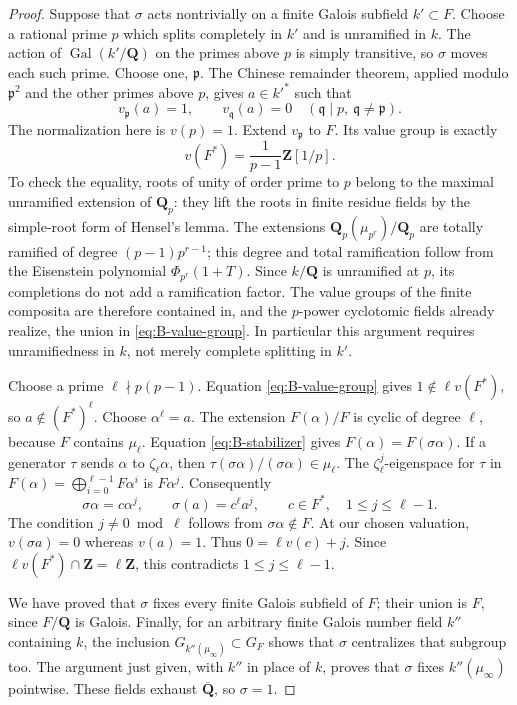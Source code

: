 \documentclass[11pt,a4paper]{article}
\begin{document}
\begin{proof}
Suppose that $\sigma$ acts nontrivially on a finite Galois subfield
$k'\subset F$. Choose a rational prime $p$ which splits completely in $k'$
and is unramified in $k$. The action of
$\operatorname{Gal}(k'/\mathbf Q)$ on the primes above $p$ is simply
transitive, so $\sigma$ moves each such prime. Choose one, $\mathfrak p$.
The Chinese remainder theorem, applied modulo $\mathfrak p^2$ and the
other primes above $p$, gives $a\in k'^*$ such that
\[
 v_{\mathfrak p}(a)=1,\qquad
 v_{\mathfrak q}(a)=0\quad(\mathfrak q\mid p,\ \mathfrak q\ne\mathfrak p).
\]
The normalization here is $v(p)=1$. Extend $v_{\mathfrak p}$ to $F$.
Its value group is exactly
\begin{equation}\label{eq:B-value-group}
 v(F^*)=\frac1{p-1}\mathbf Z[1/p].
\end{equation}
To check the equality, roots of unity of order prime to $p$ belong to the
maximal unramified extension of $\mathbf Q_p$: they lift the roots in finite
residue fields by the simple-root form of Hensel's lemma. The extensions
$\mathbf Q_p(\mu_{p^r})/\mathbf Q_p$ are totally ramified of degree
$(p-1)p^{r-1}$; this degree and total ramification follow from the
Eisenstein polynomial $\Phi_{p^r}(1+T)$.
Since $k/\mathbf Q$ is unramified at $p$, its completions do not add a
ramification factor. The value groups of the finite composita are therefore
contained in, and the $p$-power cyclotomic fields already realize, the union
in \eqref{eq:B-value-group}. In particular this argument requires
unramifiedness in $k$, not merely complete splitting in $k'$.

Choose a prime $\ell\nmid p(p-1)$. Equation \eqref{eq:B-value-group} gives
$1\notin\ell v(F^*)$, so $a\notin(F^*)^\ell$. Choose
$\alpha^\ell=a$. The extension $F(\alpha)/F$ is cyclic of degree $\ell$,
because $F$ contains $\mu_\ell$. Equation \eqref{eq:B-stabilizer} gives
$F(\alpha)=F(\sigma\alpha)$. If a generator $\tau$ sends
$\alpha$ to $\zeta_\ell\alpha$, then
$\tau(\sigma\alpha)/(\sigma\alpha)\in\mu_\ell$.
The $\zeta_\ell^j$-eigenspace for $\tau$ in
$F(\alpha)=\bigoplus_{i=0}^{\ell-1}F\alpha^i$ is $F\alpha^j$.
Consequently
\[
 \sigma\alpha=c\alpha^j,\qquad
 \sigma(a)=c^\ell a^j,
 \qquad c\in F^*,\quad 1\le j\le\ell-1.
\]
The condition $j\ne0\bmod\ell$ follows from $\sigma\alpha\notin F$.
At our chosen valuation, $v(\sigma a)=0$ whereas $v(a)=1$. Thus
$0=\ell v(c)+j$. Since
$\ell v(F^*)\cap\mathbf Z=\ell\mathbf Z$, this contradicts
$1\le j\le\ell-1$.

We have proved that $\sigma$ fixes every finite Galois subfield of $F$;
their union is $F$, since $F/\mathbf Q$ is Galois. Finally, for an arbitrary
finite Galois number field $k''$ containing $k$, the inclusion
$G_{k''(\mu_\infty)}\subset G_F$ shows that $\sigma$ centralizes that
subgroup too. The argument just given, with $k''$ in place of $k$, proves
that $\sigma$ fixes $k''(\mu_\infty)$ pointwise. These fields exhaust
$\overline{\mathbf Q}$, so $\sigma=1$.
\end{proof}
\end{document}
